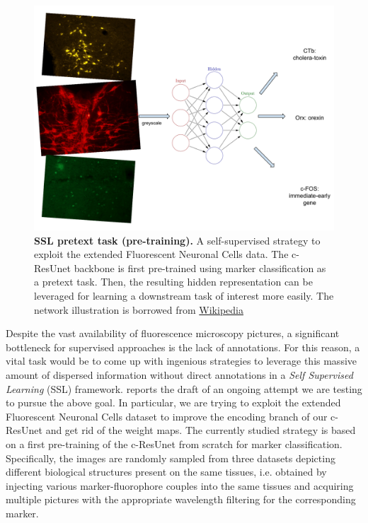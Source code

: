 \begin{figure}
    \centering
    \includegraphics[width=\textwidth]{figures/610_future_works/self-supervised pretext task.pdf}
    \caption{\textbf{SSL pretext task (pre-training).} A self-supervised strategy to exploit the extended Fluorescent Neuronal Cells data. The c-ResUnet backbone is first pre-trained using marker classification as a pretext task. 
    Then, the resulting hidden representation can be leveraged for learning a downstream task of interest more easily.
    The network illustration is borrowed from  \href{https://en.wikipedia.org/wiki/Artificial_neural_network\#/media/File:Colored_neural_network.svg}{Wikipedia}
    }
    \label{fig:SSL_diagram}
\end{figure}
Despite the vast availability of fluorescence microscopy pictures, a significant bottleneck for supervised approaches is the lack of annotations. 
For this reason, a vital task would be to come up with ingenious strategies to leverage this massive amount of dispersed information without direct annotations in a \textit{Self Supervised Learning} (SSL) framework.
 reports the draft of an ongoing attempt we are testing to pursue the above goal. 
In particular, we are trying to exploit the extended Fluorescent Neuronal Cells dataset to improve the encoding branch of our c-ResUnet and get rid of the weight maps. The currently studied strategy is based on a first pre-training of the c-ResUnet from scratch for marker classification. 
Specifically, the images are randomly sampled from three datasets depicting different biological structures present on the same tissues, i.e. obtained by injecting various marker-fluorophore couples into the same tissues and acquiring multiple pictures with the appropriate wavelength filtering for the corresponding marker.
